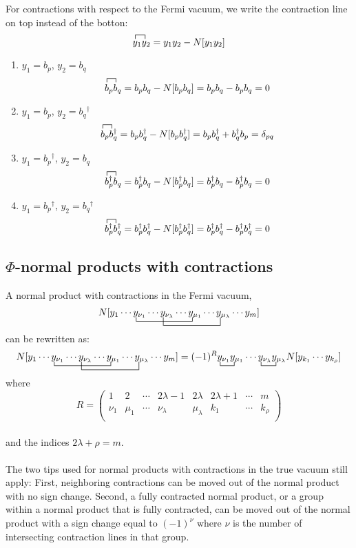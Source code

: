 \documentclass{article}
\newcommand{\ctr}{\bcontraction}
\newcommand{\fctr}{\contraction}
\newcommand{\dg}{\ensuremath{^\dagger} }
\newcommand{\cd}{\ensuremath{\cdots} }
\begin{document}
For contractions with respect to the Fermi vacuum, we write the contraction line on top instead of the botton: 
$$
\fctr{}{y}{{}_1}{y}
y_1 y_2 = y_1y_2 - N[y_1y_2]
$$

\begin{enumerate}
\item $y_1 = b_p$, $y_2 = b_q$ \\
$$
\fctr{}{b}{{}_p}{b}
b_p b_q = b_p b_q  - N[b_p b_q] = b_p b_q  - b_p b_q  = 0 
$$
\item $y_1 = b_p$, $y_2 = b_q\dg$ \\
$$
\fctr{}{b}{{}_p}{b}
b_p b_q\dg = b_p b_q\dg  - N[b_p b_q\dg] = b_p b_q\dg  +  b_q\dg b_p = \delta_{pq}
$$
\item $y_1 = b_p\dg$, $y_2 = b_q$ \\
$$
\fctr{}{b}{{}_p}{b}
b_p\dg b_q = b_p\dg b_q  - N[b_p\dg b_q] = b_p\dg b_q  - b_p\dg b_q  = 0 
$$
\item $y_1 = b_p\dg$, $y_2 = b_q\dg$ \\
$$
\fctr{}{b}{{}_p}{b}
b_p\dg b_q\dg = b_p\dg b_q\dg  - N[b_p\dg b_q\dg] = b_p\dg b_q\dg  - b_p\dg b_q\dg  = 0 
$$
\end{enumerate}

\subsection{$\Phi$-normal products with contractions}
A normal product with contractions in the Fermi vacuum,
\[ 
\ctr{N[y_1 \cd }{x}{{}_{\nu_1} \cd y_{\nu_\lambda} \cd }{x}
\ctr[2ex]{N[y_1 \cd y_{\nu_1} \cd}{ x}{{}_{\nu_\lambda} \cd y_{\mu_1} \cd }{x} 
N[y_1 \cd y_{\nu_1} \cd y_{\nu_\lambda} \cd y_{\mu_1} \cd y_{\mu_\lambda} \cd y_m] 
\] 
can be rewritten as: 
\[ 
\ctr{N[y_1 \cd }{x}{{}_{\nu_1} \cd y_{\nu_\lambda} \cd }{x}
\ctr[2ex]{N[y_1 \cd y_{\nu_1} \cd}{ x}{{}_{\nu_\lambda} \cd y_{\mu_1} \cd }{x} 
N[y_1 \cd y_{\nu_1} \cd y_{\nu_\lambda} \cd y_{\mu_1} \cd y_{\mu_\lambda} \cd y_m] 
= 
\ctr{(-1)^R}{x}{{}_{\nu_1} }{x}
\ctr{(-1)^R y_{\nu_1}y_{\mu_1} \cd}{x}{{}_{\nu_\lambda} }{x}
(-1)^R y_{\nu_1}y_{\mu_1} \cd y_{\nu_\lambda} y_{\mu_\lambda} N[y_{k_1} \cd y_{k_\rho}]
\] 
where 
\[
R = 
\begin{pmatrix}
1 & 2 & \cd & 2\lambda -1 & 2\lambda & 2\lambda + 1&\cd & m  \\
\nu_1 & \mu_1 & \cd& \nu_\lambda & \mu_\lambda  &k_1 & \cd & k_\rho \\
\end{pmatrix}
\] \\
and the indices $2\lambda + \rho = m$.
\\ \\
The two tips used for normal products with contractions in the true vacuum still apply:
First, neighboring contractions can be moved out of the normal product with no sign change.
Second, a fully contracted normal product, or a group within a normal product that is fully contracted, 
can be moved out of the normal product with a sign change equal to $(-1)^\nu$ where $\nu$ is the number of intersecting contraction lines 
in that group. 
\end{document}
